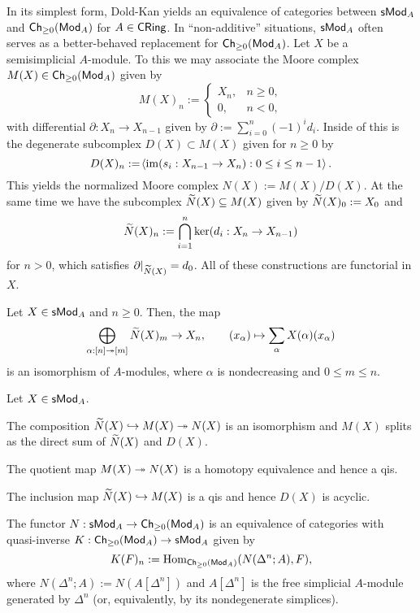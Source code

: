 \documentclass[11pt]{article}
\begin{document}
In its simplest form, Dold-Kan yields an equivalence of categories between $\operatorname{\mathsf{s}\!}\operatorname{\mathsf{Mod}}_A$ and $\operatorname{\mathsf{Ch}}_{\geq0}(\operatorname{\mathsf{Mod}}_A)$ for $A\in\operatorname{\mathsf{CRing}}$. In ``non-additive'' situations, $\operatorname{\mathsf{s}\!}\operatorname{\mathsf{Mod}}_A$ often serves as a better-behaved replacement for $\operatorname{\mathsf{Ch}}_{\geq0}(\operatorname{\mathsf{Mod}}_A)$. Let $X$ be a semisimplicial $A$-module. To this we may associate the Moore complex $M(X)\in\operatorname{\mathsf{Ch}}_{\geq0}(\operatorname{\mathsf{Mod}}_A)$ given by 
\begin{equation*}
M(X)_n:=
\begin{cases}
X_n, & n\geq0, \\
0, & n<0,
\end{cases}
\end{equation*}
with differential $\partial: X_n\to X_{n-1}$ given by $\partial:=\sum_{i=0}^n(-1)^id_i$. Inside of this is the degenerate subcomplex $D(X)\subset M(X)$ given for $n\geq0$ by 
$$D(X)_n:=\!\left\langle\operatorname{im}(s_i: X_{n-1}\to X_n) : 0\leq i\leq n-1\right\rangle.$$
This yields the normalized Moore complex $N(X):=M(X)/D(X)$. At the same time we have the subcomplex $\widetilde{N}(X)\subseteq M(X)$ given by $\widetilde{N}(X)_0:=X_0$ and 
$$\widetilde{N}(X)_n:=\bigcap_{i=1}^n\ker(d_i: X_n\to X_{n-1})$$
for $n>0$, which satisfies $\partial|_{\widetilde{N}(X)}=d_0$. All of these constructions are functorial in $X$.

\begin{lemma}
Let $X\in\operatorname{\mathsf{s}\!}\operatorname{\mathsf{Mod}}_A$ and $n\geq0$. Then, the map 
$$\bigoplus_{\alpha: [n]\twoheadrightarrow[m]}\widetilde{N}(X)_m\to X_n,\qquad (x_{\alpha})\mapsto\sum_{\alpha}X(\alpha)(x_{\alpha})$$
is an isomorphism of $A$-modules, where $\alpha$ is nondecreasing and $0\leq m\leq n$.
\end{lemma}

\begin{theorem}
Let $X\in\operatorname{\mathsf{s}\!}\operatorname{\mathsf{Mod}}_A$.
\begin{enum}{\alph}
\item The composition $\widetilde{N}(X)\hookrightarrow M(X)\twoheadrightarrow N(X)$ is an isomorphism and $M(X)$ splits as the direct sum of $\widetilde{N}(X)$ and $D(X)$.

\item The quotient map $M(X)\twoheadrightarrow N(X)$ is a homotopy equivalence and hence a qis.

\item The inclusion map $\widetilde{N}(X)\hookrightarrow M(X)$ is a qis and hence $D(X)$ is acyclic.
\end{enum}
\end{theorem}

\begin{theorem}
The functor $N: \operatorname{\mathsf{s}\!}\operatorname{\mathsf{Mod}}_A\to\operatorname{\mathsf{Ch}}_{\geq0}(\operatorname{\mathsf{Mod}}_A)$ is an equivalence of categories with quasi-inverse $K: \operatorname{\mathsf{Ch}}_{\geq0}(\operatorname{\mathsf{Mod}}_A)\to\operatorname{\mathsf{s}\!}\operatorname{\mathsf{Mod}}_A$ given by 
$$K(F)_n:=\operatorname{Hom}_{\operatorname{\mathsf{Ch}}_{\geq0}(\operatorname{\mathsf{Mod}}_A)}(N(\Delta^n;A),F),$$
where $N(\Delta^n;A):=N(A[\Delta^n])$ and $A[\Delta^n]$ is the free simplicial $A$-module generated by $\Delta^n$ (or, equivalently, by its nondegenerate simplices).
\end{theorem}
\end{document}
